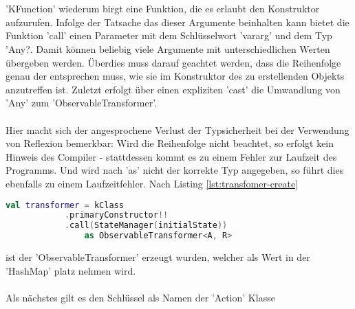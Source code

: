\\\\
'KFunction' wiederum birgt eine Funktion, die es erlaubt den Konstruktor aufzurufen. Infolge der Tatsache das dieser Argumente beinhalten kann bietet die Funktion 'call' einen Parameter mit dem Schlüsselwort 'vararg' und dem Typ 'Any?. Damit können beliebig viele Argumente mit unterschiedlichen Werten übergeben werden. Überdies muss darauf geachtet werden, dass die Reihenfolge genau der entsprechen muss, wie sie im Konstruktor des zu erstellenden Objekts anzutreffen ist. Zuletzt erfolgt über einen expliziten 'cast' die Umwandlung von 'Any' zum 'ObservableTransformer'. 
\\\\
Hier macht sich der angesprochene Verlust der Typsicherheit bei der Verwendung von Reflexion bemerkbar: Wird die Reihenfolge nicht beachtet, so erfolgt kein Hinweis des Compiler - stattdessen kommt es zu einem Fehler zur Laufzeit des Programms. Und wird nach 'as' nicht der korrekte Typ angegeben, so führt dies ebenfalls zu einem Laufzeitfehler. Nach Listing
\ref{lst:transfomer-create}
\begin{lstlisting}[caption={Konsruktor}, label={lst:transfomer-create},language=Kotlin]
val transformer = kClass
			.primaryConstructor!!
			.call(StateManager(initialState)) 
				as ObservableTransformer<A, R>
\end{lstlisting}
ist der 'ObservableTransformer' erzeugt wurden, welcher als Wert in der 'HashMap' platz nehmen wird.
\\\\
Als nächstes gilt es den Schlüssel als Namen der 'Action' Klasse 
